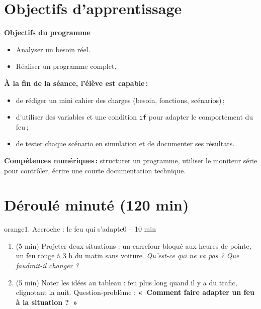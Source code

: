 \documentclass[11pt,a4paper]{article}
\begin{document}
\section{Objectifs d'apprentissage}
\begin{tcolorbox}[colback=gray!8,colframe=gray!60!black,arc=1mm,boxrule=0.5pt]
\textbf{Objectifs du programme}
\begin{itemize}
 \item Analyser un besoin réel.
 \item Réaliser un programme complet.
\end{itemize}
\textbf{À la fin de la séance, l'élève est capable\,:}
\begin{itemize}
 \item de rédiger un mini cahier des charges (besoin, fonctions, scénarios)\,;
 \item d'utiliser des variables et une condition \texttt{if} pour adapter le comportement du feu\,;
 \item de tester chaque scénario en simulation et de documenter ses résultats.
\end{itemize}
\textbf{Compétences numériques\,:} structurer un programme, utiliser le moniteur série pour contrôler, écrire une courte documentation technique.
\end{tcolorbox}

\section{Déroulé minuté (120 min)}

\begin{etape}{orange}{1. Accroche : le feu qui s'adapte}{0 -- 10 min}
\begin{enumerate}
 \item (5 min) Projeter deux situations : un carrefour bloqué aux heures de pointe, un feu rouge à 3 h du matin sans voiture. \emph{Qu'est-ce qui ne va pas ? Que faudrait-il changer ?}
 \item (5 min) Noter les idées au tableau : feu plus long quand il y a du trafic, clignotant la nuit. Question-problème : \textbf{«~Comment faire adapter un feu à la situation ?~»}
\end{enumerate}
\end{etape}
\end{document}
